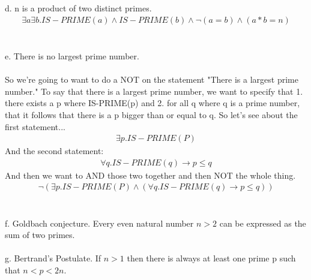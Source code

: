 \documentclass{article}
\begin{document}
\\\\
d. n is a product of two distinct primes.
\begin {align*}
\exists a \exists b. IS-PRIME(a) \wedge IS-PRIME(b) \wedge \neg (a = b) \wedge (a * b = n)
\end {align*}
\\\\
e. There is no largest prime number.
\\\\
So we're going to want to do a NOT on the statement "There is a largest prime number." To say that there is a largest prime number, we want to specify that 1. there exists a p where IS-PRIME(p) and 2. for all q where q is a prime number, that it follows that there is a p bigger than or equal to q. So let's see about the first statement...
\begin {align*}
\exists p. IS-PRIME(P)
\end {align*}
And the second statement:
\begin {align*}
\forall q. IS-PRIME(q) \rightarrow p \leq q
\end {align*}
And then we want to AND those two together and then NOT the whole thing.
\begin {align*}
\neg (\exists p. IS-PRIME(P) \wedge (\forall q. IS-PRIME(q) \rightarrow p \leq q))
\end {align*}
\\\\
f. Goldbach conjecture. Every even natural number $n > 2$ can be expressed as the sum of two primes. 
\\\\
g. Bertrand's Postulate. If $n > 1$ then there is always at least one prime p such that $n < p < 2n$.
\end{document}
